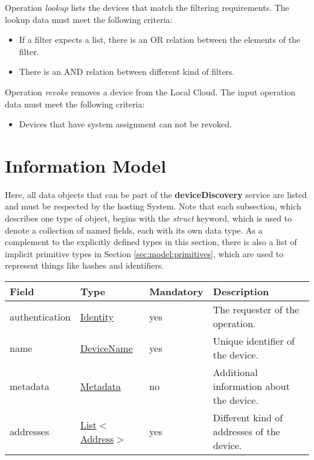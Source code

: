 \documentclass[a4paper]{arrowhead}
\newcommand{\pref}[1]{{\textcolor{ArrowheadGrey}{\hyperref[sec:model:primitives:#1]{#1}}}}
\begin{document}

Operation \textit{lookup} lists the devices that match the filtering requirements. The lookup data must meet the following criteria:

\begin{itemize}
    \item If a filter expects a list, there is an OR relation between the elements of the filter.
    \item There is an AND relation between different kind of filters.
\end{itemize}


Operation \textit{revoke} removes a device from the Local Cloud. The input operation data must meet the following criteria:

\begin{itemize}
    \item Devices that have system assignment can not be revoked.
\end{itemize}

\clearpage

\section{Information Model}
\label{sec:model}

Here, all data objects that can be part of the \textbf{deviceDiscovery} service are listed and must be respected by the hosting System.
Note that each subsection, which describes one type of object, begins with the \textit{struct} keyword, which is used to denote a collection of named fields, each with its own data type.
As a complement to the explicitly defined types in this section, there is also a list of implicit primitive types in Section \ref{sec:model:primitives}, which are used to represent things like hashes and identifiers.

{}
 
\begin{table}[ht!]
\begin{tabularx}{\textwidth}{| p{3cm} | p{3cm} | p{2cm} | X |} \hline
\rowcolor{gray!33} Field & Type & Mandatory & Description \\ \hline
authentication & \hyperref[sec:model:Identity]{Identity} & yes & The requester of the operation. \\ \hline
name & \pref{DeviceName} & yes & Unique identifier of the device. \\ \hline
metadata &\hyperref[sec:model:Metadata]{Metadata} & no & Additional information about the device. \\ \hline
addresses &  \pref{List}$<$\pref{Address}$>$ & yes & Different kind of addresses of the device.  \\ \hline
\end{tabularx}
\end{table}
\end{document}
